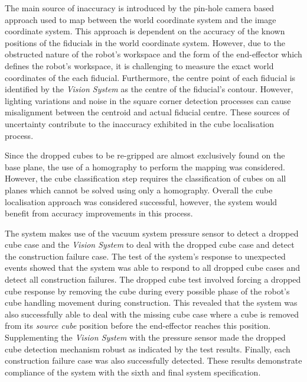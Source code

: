 The main source of inaccuracy is introduced by the pin-hole camera based approach used to map between the world coordinate system and the image coordinate system. This approach is dependent on the accuracy of the known positions of the fiducials in the world coordinate system. However, due to the obstructed nature of the robot's workspace and the form of the end-effector which defines the robot's workspace, it is challenging to measure the exact world coordinates of the each fiducial. Furthermore, the centre point of each fiducial is identified by the \textit{Vision System} as the centre of the fiducial's contour. However, lighting variations and noise in the square corner detection processes can cause misalignment between the centroid and actual fiducial centre. These sources of uncertainty contribute to the inaccuracy exhibited in the cube localisation process. 

Since the dropped cubes to be re-gripped are almost exclusively found on the base plane, the use of a homography to perform the mapping was considered. However, the cube classification step requires the classification of cubes on all planes which cannot be solved using only a homography. Overall the cube localisation approach was considered successful, however, the system would benefit from accuracy improvements in this process.

The system makes use of the vacuum system pressure sensor to detect a dropped cube case and the \textit{Vision System} to deal with the dropped cube case and detect the construction failure case. The test of the system's response to unexpected events showed that the system was able to respond to all dropped cube cases and detect all construction failures. The dropped cube test involved forcing a dropped cube response by removing the cube during every possible phase of the robot's cube handling movement during construction. This revealed that the system was also successfully able to deal with the missing cube case where a cube is removed from its \textit{source cube} position before the end-effector reaches this position. Supplementing the \textit{Vision System} with the pressure sensor made the dropped cube detection mechanism robust as indicated by the test results. Finally, each construction failure case was also successfully detected. These results demonstrate compliance of the system with the sixth and final system specification.





